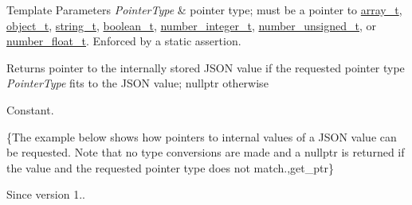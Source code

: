 \begin{DoxyTemplParams}{Template Parameters}
{\em Pointer\+Type} & pointer type; must be a pointer to \hyperlink{classnlohmann_1_1basic__json_a53700c308d804f84aea5ff05abb2ac4e}{array\+\_\+t}, \hyperlink{classnlohmann_1_1basic__json_a5e3df077f880583a96d74cd63e173cb2}{object\+\_\+t}, \hyperlink{classnlohmann_1_1basic__json_a33593865ffb1860323dcbd52425b90c8}{string\+\_\+t}, \hyperlink{classnlohmann_1_1basic__json_a44fd1a12c9c54623c942b430e7a72937}{boolean\+\_\+t}, \hyperlink{classnlohmann_1_1basic__json_a11e390944da90db83089eb2426a749d3}{number\+\_\+integer\+\_\+t}, \hyperlink{classnlohmann_1_1basic__json_ae09af9c23351b7245d9be4d1b2035fef}{number\+\_\+unsigned\+\_\+t}, or \hyperlink{classnlohmann_1_1basic__json_a5b8abaebd922d82d69756327c0c347e6}{number\+\_\+float\+\_\+t}. Enforced by a static assertion.\\
\hline
\end{DoxyTemplParams}
\begin{DoxyReturn}{Returns}
pointer to the internally stored J\+S\+ON value if the requested pointer type {\itshape Pointer\+Type} fits to the J\+S\+ON value; {\ttfamily nullptr} otherwise
\end{DoxyReturn}
Constant.

\{The example below shows how pointers to internal values of a J\+S\+ON value can be requested. Note that no type conversions are made and a {\ttfamily nullptr} is returned if the value and the requested pointer type does not match.,get\+\_\+ptr\}

\begin{DoxySince}{Since}
version 1.. 
\end{DoxySince}

